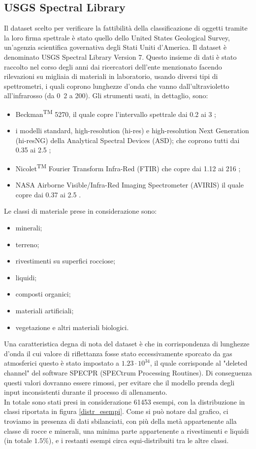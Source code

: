 \subsection{USGS Spectral Library}
Il dataset scelto per verificare la fattibilità della classificazione di oggetti tramite la loro firma spettrale è stato quello dello United States
Geological Survey, un'agenzia scientifica governativa degli Stati Uniti d'America.
Il dataset è denominato USGS Spectral Library Version 7.
Questo insieme di dati è stato raccolto nel corso degli anni dai ricercatori dell'ente menzionato facendo rilevazioni su migliaia di materiali in laboratorio,
usando diversi tipi di spettrometri, i quali coprono lunghezze d'onda che vanno dall'ultravioletto all'infrarosso (da \unit{0.2}{\micro\meter} a \unit{200}{\micro\meter}).
Gli strumenti usati, in dettaglio, sono:
\begin{itemize}
    \item Beckman\textsuperscript{TM} 5270, il quale copre l'intervallo spettrale dai 0.2 ai 3 \micro\meter;
    \item i modelli standard, high-resolution (hi-res) e high-resolution Next Generation (hi-resNG) della Analytical Spectral Devices (ASD);
          che coprono tutti dai 0.35 ai 2.5 \micro\meter;
    \item Nicolet\textsuperscript{TM} Fourier Transform Infra-Red (FTIR) che copre dai 1.12 ai 216 \micro\meter;
    \item NASA Airborne Visible/Infra-Red Imaging Spectrometer (AVIRIS) il quale copre dai 0.37 ai 2.5 \micro\meter.
\end{itemize}
Le classi di materiale prese in considerazione sono:
\begin{itemize}
    \item minerali;
    \item terreno;
    \item rivestimenti su superfici rocciose;
    \item liquidi;
    \item composti organici;
    \item materiali artificiali;
    \item vegetazione e altri materiali biologici.
\end{itemize}
Una caratteristica degna di nota del dataset è che in corrispondenza di lunghezze d'onda il cui valore di riflettanza fosse stato eccessivamente sporcato da gas atmosferici questo è stato impostato a $1.23 \cdot 10^{34}$, il quale corrisponde al "deleted channel" del software SPECPR (SPECtrum Processing Routines). Di conseguenza questi valori dovranno essere rimossi, per evitare che il modello prenda degli input inconsistenti durante il processo di allenamento.\\
In totale sono stati presi in considerazione 61453 esempi, con la distribuzione in classi riportata in figura \ref{distr_esempi}. Come si può notare dal grafico, ci troviamo in presenza di dati sbilanciati, con più della metà appartenente alla classe di rocce e minerali, una minima parte appartenente a rivestimenti e liquidi (in totale $1.5\%$), e i restanti esempi circa equi-distribuiti tra le altre classi.

